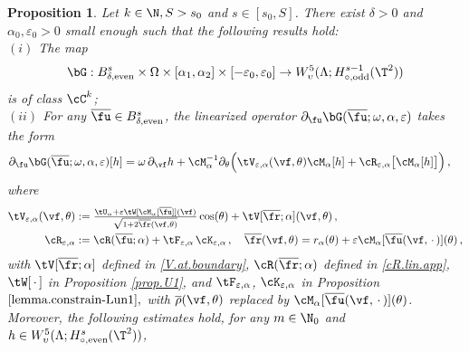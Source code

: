 \documentclass[a4paper,reqno,10pt]{article}
\newtheorem{pro}{Proposition}[section]
\newcommand{\pa}{\partial}
\begin{document}
\begin{pro}\label{lemma.map.bG}
	Let $k\in\N, S>s_0$ and $s\in[s_0,S]$. There exist $\delta>0$ and  $\alpha_{0},\varepsilon_{0}>0$ small enough  such that the following results  hold:
    \\[1mm]
    \noindent $(i)$ The map
    \begin{equation}
		\bG: B_{\delta,\textnormal{even}}^{s} \times \Omega \times [\alpha_{1},\alpha_{2}]\times [-\varepsilon_{0},\varepsilon_{0}] \to{W_\upsilon^5(\Lambda;H^{s-1}_{\circ,\textnormal{odd}}(\T^2))}
	\end{equation}
	is  of class $\cC^k$; 
    \\[1mm]
    \noindent $(ii)$  For any $\overline{\fu} \in B_{\delta,{\rm even}}^{s}$,  the linearized operator $\partial_\fu\bG(\overline{\fu};\omega,\alpha,\varepsilon)$ takes the form
    \begin{align} \partial_\fu\bG(\overline{\fu};\omega,\alpha,\varepsilon) 
   [h]  
    &=\omega\,\pa_{\vf} h + \cM_{\alpha}^{-1}\pa_{\theta} \Big( \tV_{\varepsilon,\alpha}(\vf,\theta) \cM_{\alpha}[h]  + \cR_{\varepsilon,\alpha}\big[ \cM_{\alpha}[h] \big] \Big)\,,
\end{align}
where
\begin{align}
	\tV_{\varepsilon,\alpha}(\vf,\theta) & := \tfrac{\tU_{\alpha} + \varepsilon \tW[\cM_{\alpha}[\overline{\fu}]](\vf) }{{\sqrt{1+2\overline{\fr}(\vf,\theta)}}} \cos(\theta) + \tV[\overline{\fr};\alpha](\vf,\theta) \,, \label{tV.vare} \\
	\cR_{\varepsilon,\alpha} & := \cR(\overline{\fu};\alpha) +\tF_{\varepsilon,\alpha}\,\cK_{\varepsilon,\alpha} \,, \quad \overline{\fr}(\vf,\theta) = r_{\alpha}(\theta) + \varepsilon \cM_{\alpha}[\overline{\fu}(\vf,\,\cdot\,)](\theta)\,, \label{cR.vare}
\end{align}
with $\tV[\overline{\fr};\alpha]$  defined in \eqref{V.at.boundary}, $\cR(\overline{\fr};\alpha)$ defined in \eqref{cR.lin.app}, $\tW[\,\cdot\,]$ in Proposition \ref{prop.U1}, and $\tF_{\varepsilon,\alpha}$, $\cK_{\varepsilon,\alpha}$ in Proposition $\ref{lemma.constrain-Lun1},$ with $\overline{\rho}(\vf,\theta)$ replaced by $\cM_{\alpha}[{\overline{\fu}}({\vf},\,\cdot\,)](\theta)$. Moreover, the following estimates hold,  for any $m\in\N_{0}$ and  $h\in {W_\upsilon^5(\Lambda;H_{\circ,{\rm even}}^s(\T^2))}$,

\end{pro}
\end{document}
